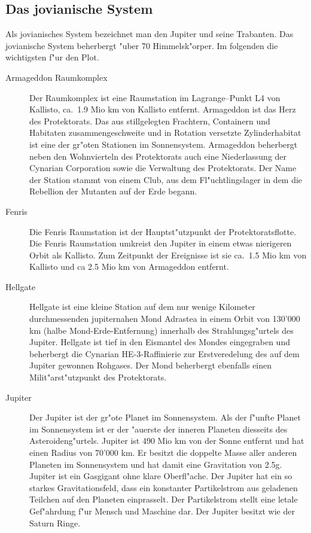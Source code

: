 \begin{appendices}
\section{Das jovianische System}

Als jovianisches System bezeichnet man den Jupiter und seine Trabanten. Das jovianische System beherbergt "uber 70  Himmelsk"orper. Im folgenden die wichtigsten f"ur den Plot.

\begin{description}
\item [Armageddon Raumkomplex] Der Raumkomplex ist eine Raumstation im Lagrange--Punkt L4 von Kallisto, ca.~1.9 Mio km         von Kallisto entfernt. Armageddon ist das Herz des Protektorats. Das aus stillgelegten Frachtern, Containern und
      Habitaten zusammengeschwei\3te und in Rotation versetzte Zylinderhabitat ist eine der gr"o\3ten Stationen im Sonnensystem. Armageddon beherbergt neben den Wohnvierteln des Protektorats auch eine Niederlassung der Cynarian Corporation sowie die Verwaltung des Protektorats. Der Name der Station stammt von einem Club, aus dem Fl"uchtlingslager in dem die Rebellion der Mutanten auf der Erde begann.
\item [Fenris] Die Fenris Raumstation ist der Hauptst"utzpunkt der Protektoratsflotte. Die Fenris Raumstation umkreist
      den Jupiter in einem etwas nierigeren Orbit als Kallisto. Zum Zeitpunkt der Ereignisse ist sie ca.~1.5 Mio km von Kallisto und ca 2.5 Mio km von Armageddon entfernt.
\item [Hellgate] Hellgate ist eine kleine Station auf dem nur wenige Kilometer durchmessenden jupiternahen Mond
      Adrastea in einem Orbit von 130'000 km (halbe Mond-Erde-Entfernung) innerhalb des Strahlungsg"urtels des Jupiter. Hellgate ist tief in den Eismantel des Mondes eingegraben und beherbergt die Cynarian HE-3-Raffinierie zur Erstveredelung des auf dem Jupiter gewonnen Rohgases. Der Mond beherbergt ebenfalls einen Milit"arst"utzpunkt des Protektorats.
\item [Jupiter] Der Jupiter ist der gr"o\3te Planet im Sonnensystem. Als der f"unfte Planet im Sonnensystem ist er der
      "au\3erste der inneren Planeten diesseits des Asteroideng"urtels. Jupiter ist 490 Mio km von der Sonne entfernt und hat einen Radius von 70'000 km. Er besitzt die doppelte Masse aller anderen Planeten im Sonnensystem und hat damit eine Gravitation von 2.5g. Jupiter ist ein Gasgigant ohne klare Oberfl"ache. Der Jupiter hat ein so starkes Gravitationsfeld, dass ein konstanter Partikelstrom aus geladenen Teilchen auf den Planeten einprasselt. Der Partikelstrom stellt eine letale Gef"ahrdung f"ur Mensch und Maschine dar. Der Jupiter besitzt wie der Saturn Ringe.

\end{description}
\end{appendices}
